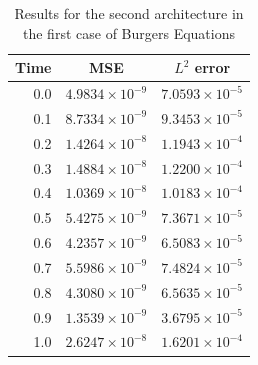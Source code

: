 \documentclass[12pt,letterpaper]{article}
\begin{document}
  \begin{table}[H]
    \begin{center}
    \begin{tabular}{ r | c  c }
    \textbf{Time} & \textbf{MSE} & \textbf{$L^2$ error} \\ \hline
    0.0 & $ 4.9834\times 10^{-9}$ & $ 7.0593\times 10^{-5} $ \\
    0.1 & $ 8.7334\times 10^{-9}$ & $ 9.3453\times 10^{-5} $ \\
    0.2 & $ 1.4264\times 10^{-8}$ & $ 1.1943\times 10^{-4} $ \\
    0.3 & $ 1.4884\times 10^{-8}$ & $ 1.2200\times 10^{-4} $ \\
    0.4 & $ 1.0369\times 10^{-8}$ & $ 1.0183\times 10^{-4} $ \\
    0.5 & $ 5.4275\times 10^{-9}$ & $ 7.3671\times 10^{-5} $ \\
    0.6 & $ 4.2357\times 10^{-9}$ & $ 6.5083\times 10^{-5} $ \\
    0.7 & $ 5.5986\times 10^{-9}$ & $ 7.4824\times 10^{-5} $ \\
    0.8 & $ 4.3080\times 10^{-9}$ & $ 6.5635\times 10^{-5} $ \\
    0.9 & $ 1.3539\times 10^{-9}$ & $ 3.6795\times 10^{-5} $ \\
    1.0 & $ 2.6247\times 10^{-8}$ & $ 1.6201\times 10^{-4} $ \\
    \end{tabular}
    \caption{Results for the second architecture in the first case of Burgers Equations}
    \label{tab:B12}
    \end{center}

    \end{table}
\end{document}
